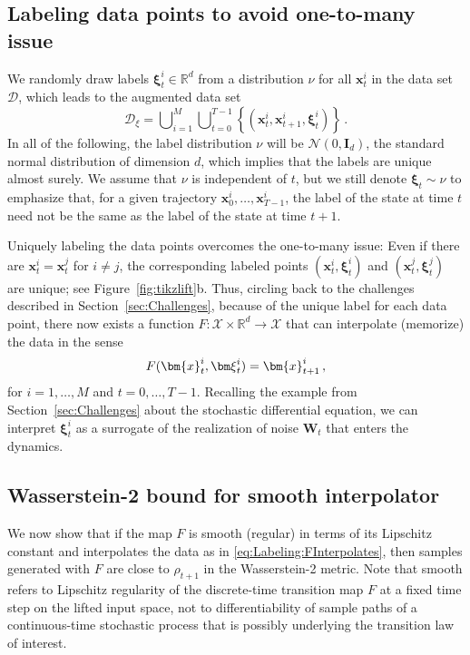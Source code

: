 \documentclass{article}
\theoremstyle{plain}
\theoremstyle{definition}
\theoremstyle{remark}
\newcommand{\ldim}{d} %
\newcommand{\bfxi}{{\bm \xi}}
\newcommand{\labeldist}{\nu}
\newcommand{\x}{\bm{x}}
\newcommand{\W}{\boldsymbol{W}}
\newcommand{\bR}{\mathbb{R}}
\begin{document}
\subsection{Labeling data points to avoid one-to-many issue}
We randomly draw labels $\bfxi_t^{i} \in \mathbb{R}^{\ldim}$ from a distribution $\nu$ for all $\x_t^{i}$ in the data set $\mathcal{D}$, which leads to the augmented data set
\begin{equation}
  \label{eq:LabeledD}
  \mathcal{D}_{\xi} = \bigcup\nolimits_{i = 1}^M \bigcup\nolimits_{t = 0}^{T-1} \left\{ \left(\x_{t}^{i}, \x_{t+1}^{i}, \bfxi_t^{i} \right)\right\}\,.
\end{equation}
In all of the following, the label distribution $\nu$ will be $\mathcal N(0, \boldsymbol{I}_\ldim)$, the standard normal distribution of dimension $\ldim$, which implies that the labels are unique almost surely. We assume that $\labeldist$ is independent of $t$, but we still denote $\bfxi_t \sim \labeldist$ to emphasize that, for a given trajectory $\x^i_0, \ldots, \x^i_{T-1}$, the label of the state at time $t$ need not be the same as the label of the state at time $t+1$.

Uniquely labeling the data points overcomes the one-to-many issue: Even if there are $\x_t^{i} = \x_t^{j}$ for $i \neq j$, the corresponding labeled points $(\x_t^{i}, \bfxi_t^{i})$ and $(\x_t^{j}, \bfxi_t^{j})$ are unique; see Figure~\ref{fig:tikzlift}b.
Thus, circling back to the challenges described in Section~\ref{sec:Challenges}, because of the unique label for each data point, there now exists a function $F: \mathcal{X} \times {\bR^d} \to \mathcal{X}$ that can interpolate (memorize) the data in the sense\vspace*{-0.14cm}
\begin{align}
  \label{eq:Labeling:FInterpolates}
  F(\x_t^{i}, \bfxi_t^{i}) = \x_{t + 1}^{i}\,,\vspace*{-0.15cm}
\end{align}
for $i = 1, \dots, M$ and $t = 0, \dots, T - 1$.
Recalling the example from Section~\ref{sec:Challenges} about the stochastic differential equation, we can interpret $\bfxi_t^{i}$ as a surrogate of the realization of noise $\W_t$ that enters the dynamics.

\subsection{Wasserstein-2 bound for smooth interpolator}

We now show that if the map $F$ is smooth (regular) in terms of its Lipschitz constant and interpolates the data as in \eqref{eq:Labeling:FInterpolates}, then samples generated with $F$ are close to $\rho_{t + 1}$ in the Wasserstein-2 metric.
Note that smooth refers to Lipschitz regularity of the discrete-time transition map $F$ at a fixed time step on the lifted input space, not to differentiability of sample paths of a continuous-time stochastic process that is possibly underlying the transition law of interest.
\end{document}
